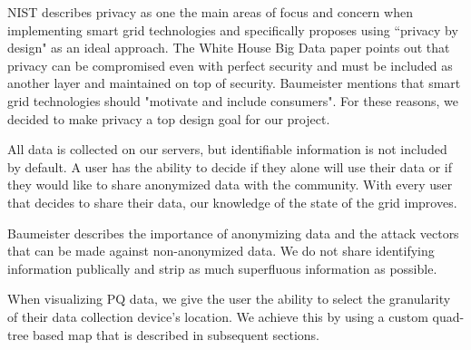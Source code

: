 NIST describes privacy as one the main areas of focus and concern when implementing smart grid technologies\cite{p:kursawe_privacy_friendly_2011} and specifically proposes using ``privacy by design" as an ideal approach. The White House Big Data paper\cite{whitehouse} points out that privacy can be compromised even with perfect security and must be included as another layer and maintained on top of security. Baumeister \cite{baumeister2010literature} mentions that smart grid technologies should "motivate and include consumers". For these reasons, we decided to make privacy a top design goal for our project.

All data is collected on our servers, but identifiable information is not included by default. A user has the ability to decide if they alone will use their data or if they would like to share anonymized data with the community. With every user that decides to share their data, our knowledge of the state of the grid improves.

Baumeister\cite{baumeister2010literature} describes the importance of anonymizing data and the attack vectors that can be made against non-anonymized data. We do not share identifying information publically and strip as much superfluous information as possible.

When visualizing PQ data, we give the user the ability to select the granularity of their data collection device's location. We achieve this by using a custom quad-tree based map that is described in subsequent sections.
